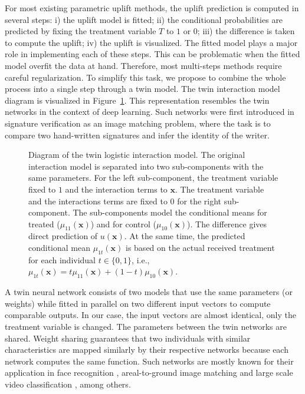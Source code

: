 \documentclass{article}
\def\x{\mathbf x}
\begin{document}
For most existing parametric uplift methods, the uplift prediction is computed in several steps: i) the uplift model is fitted; ii) the conditional probabilities are predicted by fixing the treatment variable $T$ to $1$ or $0$; iii) the difference is taken to compute the uplift; iv) the uplift is visualized. The fitted model plays a major role in implementing each of these steps. This can be problematic when the fitted model overfit the data at hand. Therefore, most multi-steps methods require careful regularization. To simplify this task, we propose to combine the whole process into a single step through a twin model. The twin interaction model diagram is visualized in  Figure~\ref{fig:siamese_network}. This representation resembles the twin networks \citep{bromley1994signature} in the context of deep learning. Such networks were first introduced in signature verification as an image matching problem, where the task is to compare two hand-written signatures and infer the identity of the writer.

\begin{figure}[!ht]
    \centering
    
    \caption{Diagram of the twin logistic interaction model. The original interaction model is separated into two sub-components with the same parameters. For the left sub-component, the treatment variable fixed to $1$ and the interaction terms to $\x$. The treatment variable and the interactions terms are fixed to $0$ for the right sub-component. The sub-components model the conditional means for treated ($\mu_{11}(\x)$) and for control ($\mu_{10}(\x)$). The difference gives direct prediction of $u(\x)$. At the same time, the predicted conditional mean $\mu_{1t}(\x)$ is based on the actual received treatment for each individual $t \in \{0,1\}$, i.e., $\mu_{1t}(\x) = t \mu_{11}(\x) + (1-t) \mu_{10}(\x)$.}
    \label{fig:siamese_network}
\end{figure}


A twin neural network consists of two models that use the same parameters (or weights) while fitted in parallel on two different input vectors to compute comparable outputs. In our case, the input vectors are almost identical, only the treatment variable is changed. The parameters between the twin networks are shared. Weight sharing guarantees that two individuals with similar characteristics are mapped similarly by their respective networks because each network computes the same function. Such networks are mostly known for their application in face recognition \citep{chopra2005learning,taigman2014deepface,parkhi2015deep,schroff2015facenet}, areal-to-ground image matching \citep{lin2015learning} %
and large scale video classification \citep{karpathy2014large}%
, among others. 
\end{document}
